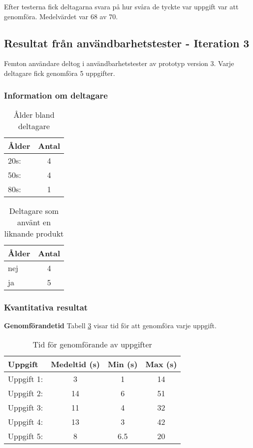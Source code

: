 Efter testerna fick deltagarna svara på hur svåra de tyckte var uppgift var att genomföra. Medelvärdet var 68 av 70.




\subsection{Resultat från användbarhetstester - Iteration 3}

Femton användare deltog i användbarhetstester av prototyp version 3. Varje deltagare fick genomföra 5 uppgifter. 

\subsubsection{Information om deltagare}

\begin{table}[H]
\centering
\begin{tabular}{|l|c|}
\hline
\textbf{Ålder} & \textbf{Antal} \\
\hline
20s:  & 4  \\ 
50s:  & 4  \\
80s:  & 1  \\
\hline
\end{tabular}
\caption{Ålder bland deltagare}
\label{tab:age1}
\end{table}

\begin{table}[H]
\centering
\begin{tabular}{|l|c|}
\hline
\textbf{Ålder} & \textbf{Antal} \\
\hline
nej  & 4   \\
ja  & 5  \\
\hline
\end{tabular}
\caption{Deltagare som använt en liknande produkt}
\label{tab:exp1}
\end{table}

\subsubsection{Kvantitativa resultat}

\textbf{Genomförandetid}
Tabell \ref{tab:tid} visar tid för att genomföra varje uppgift.
\begin{table}[H]
\centering
\begin{tabular}{|l|c|c|c|}
\hline
\textbf{Uppgift} & \textbf{Medeltid (s)} & \textbf{Min (s)} & \textbf{Max (s)} \\
\hline
Uppgift 1:  & 3 & 1 & 14 \\
Uppgift 2:  & 14 & 6 & 51\\
Uppgift 3:  & 11 & 4 & 32\\
Uppgift 4:  & 13 & 3 & 42\\
Uppgift 5:  & 8 & 6.5 & 20\\
\hline
\end{tabular}
\caption{Tid för genomförande av uppgifter}
\label{tab:tid}
\end{table}

